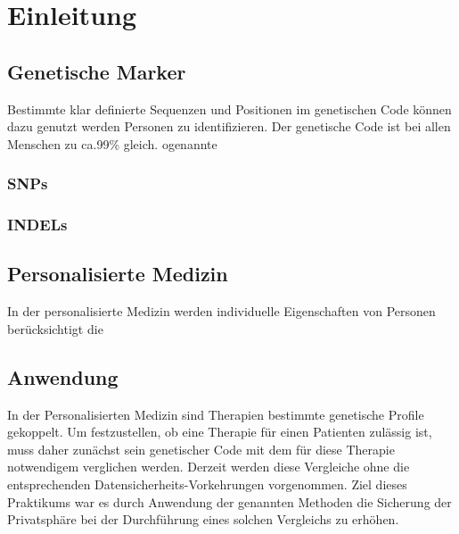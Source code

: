 \chapter{Einleitung}
\label{sec:Chapter1}


\section{Genetische Marker}
Bestimmte klar definierte Sequenzen und Positionen im genetischen Code können dazu genutzt werden Personen zu identifizieren.
Der genetische Code ist bei allen Menschen zu ca.99\% gleich. ogenannte 

\subsection{SNPs}

\subsection{INDELs}

\section{Personalisierte Medizin}
In der personalisierte Medizin werden individuelle Eigenschaften von Personen berücksichtigt die  

\section{Anwendung}
In der Personalisierten Medizin sind  Therapien bestimmte genetische Profile  gekoppelt.
Um festzustellen, ob eine Therapie für einen Patienten zulässig ist, muss daher zunächst sein genetischer Code mit dem für diese Therapie notwendigem verglichen werden.
Derzeit werden diese Vergleiche ohne die entsprechenden Datensicherheits-Vorkehrungen vorgenommen.
Ziel dieses Praktikums war es durch Anwendung der genannten Methoden die Sicherung der Privatsphäre bei der Durchführung eines solchen Vergleichs zu erhöhen.

